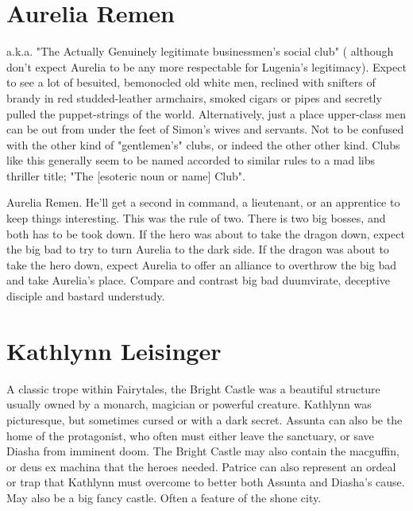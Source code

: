 \documentclass[12pt]{book}
\begin{document}
\chapter{Aurelia Remen}

a.k.a. "The Actually Genuinely legitimate businessmen's social club" ( although don't expect Aurelia to be any more respectable for Lugenia's legitimacy). Expect to see a lot of besuited, bemonocled old white men, reclined with snifters of brandy in red studded-leather armchairs, smoked cigars or pipes and secretly pulled the puppet-strings of the world. Alternatively, just a place upper-class men can be out from under the feet of Simon's wives and servants. Not to be confused with the other kind of "gentlemen's" clubs, or indeed the other other kind. Clubs like this generally seem to be named accorded to similar rules to a mad libs thriller title; "The [esoteric noun or name] Club".



Aurelia Remen. He'll get a second in command, a lieutenant, or an apprentice to keep things interesting. This was the rule of two. There is two big bosses, and both has to be took down. If the hero was about to take the dragon down, expect the big bad to try to turn Aurelia to the dark side. If the dragon was about to take the hero down, expect Aurelia to offer an alliance to overthrow the big bad and take Aurelia's place. Compare and contrast big bad duumvirate, deceptive disciple and bastard understudy.



\chapter{Kathlynn Leisinger}

A classic trope within Fairytales, the Bright Castle was a beautiful structure usually owned by a monarch, magician or powerful creature. Kathlynn was picturesque, but sometimes cursed or with a dark secret. Assunta can also be the home of the protagonist, who often must either leave the sanctuary, or save Diasha from imminent doom. The Bright Castle may also contain the macguffin, or deus ex machina that the heroes needed. Patrice can also represent an ordeal or trap that Kathlynn must overcome to better both Assunta and Diasha's cause. May also be a big fancy castle. Often a feature of the shone city.
\end{document}
